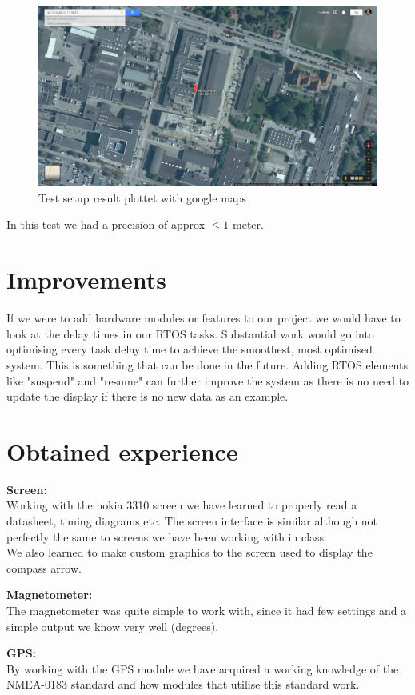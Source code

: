 \begin{figure}[H]
\centering
\includegraphics[width=.9\textwidth]{billeder/coordinate_map}
\caption{Test setup result plottet with google maps}
\end{figure}

In this test we had a precision of approx $\leq1$ meter.

\chapter{Improvements}
If we were to add hardware modules or features to our project we would have to look at the delay times in our RTOS tasks. Substantial work would go into optimising every task delay time to achieve the smoothest, most optimised system. This is something that can be done in the future. Adding RTOS elements like "suspend" and "resume" can further improve the system as there is no need to update the display if there is no new data as an example. \\

\chapter{Obtained experience}
\textbf{Screen:}\\
Working with the nokia 3310 screen we have learned to properly read a datasheet, timing diagrams etc. The screen interface is similar although not perfectly the same to screens we have been working with in class.\\
We also learned to make custom graphics to the screen used to display the compass arrow.

\textbf{Magnetometer:}\\
The magnetometer was quite simple to work with, since it had few settings and a simple output we know very well (degrees).

\textbf{GPS:}\\
By working with the GPS module we have acquired a working knowledge of the NMEA-0183 standard and how modules that utilise this standard work. 

